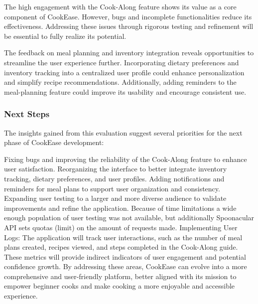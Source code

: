\documentclass[10pt,twocolumn]{article}
\begin{document}
The high engagement with the Cook-Along feature shows its value as a core component of CookEase. However, bugs and incomplete functionalities reduce its effectiveness. Addressing these issues through rigorous testing and refinement will be essential to fully realize its potential.

The feedback on meal planning and inventory integration reveals opportunities to streamline the user experience further. Incorporating dietary preferences and inventory tracking into a centralized user profile could enhance personalization and simplify recipe recommendations. Additionally, adding reminders to the meal-planning feature could improve its usability and encourage consistent use.

\subsubsection{Next Steps}
The insights gained from this evaluation suggest several priorities for the next phase of CookEase development:

Fixing bugs and improving the reliability of the Cook-Along feature to enhance user satisfaction.
Reorganizing the interface to better integrate inventory tracking, dietary preferences, and user profiles.
Adding notifications and reminders for meal plans to support user organization and consistency.
Expanding user testing to a larger and more diverse audience to validate improvements and refine the application. Because of time limitations a wide enough population of user testing was not available, but additionally Spoonacular API sets quotas (limit) on the amount of requests made.
Implementing User Logs: The application will track user interactions, such as the number of meal plans created, recipes viewed, and steps completed in the Cook-Along guide. These metrics will provide indirect indicators of user engagement and potential confidence growth.
By addressing these areas, CookEase can evolve into a more comprehensive and user-friendly platform, better aligned with its mission to empower beginner cooks and make cooking a more enjoyable and accessible experience.
\end{document}
